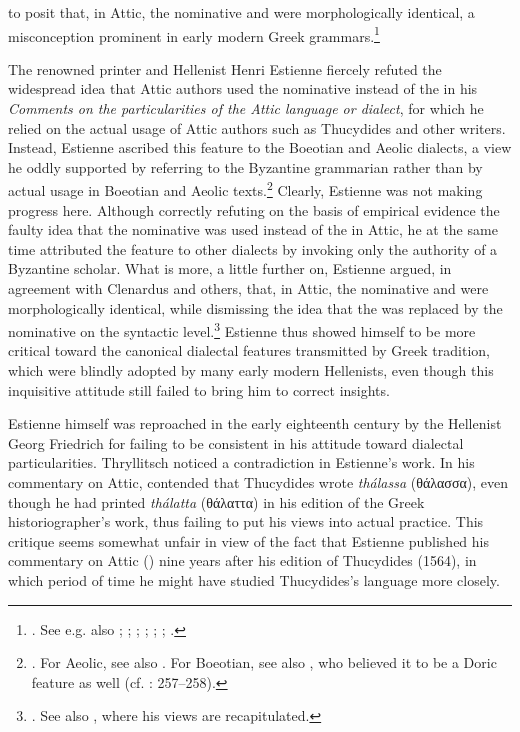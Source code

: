 to posit that, in Attic, the nominative and  were morphologically identical, a misconception prominent in early modern Greek grammars.\footnote{\citet[7 (misprint for 6)]{Clenardus1530}. See e.g. also \citet[534]{Crusius1558}; \citet[12\textsc{\textsuperscript{r}}]{Baile1588}; \citet[11, 37]{Walper1589}; \citet[32, 34]{Gretser1593}; \citet[53, 453]{Lancelot1655}; \citet[101]{Giraudeau1739}; \citet[20]{Facius1782}.}

The renowned printer and Hellenist Henri Estienne fiercely refuted the widespread idea that Attic authors used the nominative instead of the  in his \textit{Comments on the particularities of the Attic language or dialect}, for which he relied on the actual usage of Attic authors such as Thucydides and other writers. Instead, Estienne ascribed this feature to the Boeotian and Aeolic dialects, a view he oddly supported by referring to the Byzantine grammarian  rather than by actual usage in Boeotian and Aeolic texts.\footnote{\citet[15]{Estienne1573}. For Aeolic, see also \citet[{\scriptsize{)(}}.4\textsc{\textsuperscript{v}}]{Schmidt1604}. For Boeotian, see also \citet[71]{Merigon1621}, who believed it to be a Doric feature as well (cf. \citealt{Maittaire1706}: 257–258).} Clearly, Estienne was not making progress here. Although correctly refuting on the basis of empirical evidence the faulty idea that the nominative was used instead of the  in Attic, he at the same time attributed the feature to other dialects by invoking only the authority of a Byzantine scholar. What is more, a little further on, Estienne argued, in agreement with Clenardus and others, that, in Attic, the nominative and  were morphologically identical, while dismissing the idea that the  was replaced by the nominative on the syntactic level.\footnote{\citet[17]{Estienne1573}. See also \citet[29, 42–43, 150]{Estienne1573}, where his views are recapitulated.} Estienne thus showed himself to be more critical toward the canonical dialectal features transmitted by Greek tradition, which were blindly adopted by many early modern Hellenists, even though this inquisitive attitude still failed to bring him to correct insights.

Estienne himself was reproached in the early eighteenth century by the Hellenist Georg Friedrich \citet[d.3\textsuperscript{v}]{Thryllitsch1709} for failing to be consistent in his attitude toward dialectal particularities. Thryllitsch noticed a contradiction in Estienne’s work. In his commentary on Attic, \citet[13]{Estienne1573} contended that Thucydides wrote \textit{thálassa} (θάλασσα), even though he had printed \textit{thálatta} (θάλαττα) in his edition of the Greek historiographer’s work, thus failing to put his views into actual practice. This critique seems somewhat unfair in view of the fact that Estienne published his commentary on Attic (\citeyear{Estienne1573}) nine years after his edition of Thucydides (1564), in which period of time he might have studied Thucydides’s language more closely.

